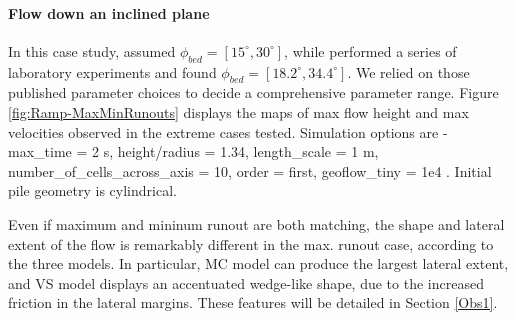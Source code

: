 \documentclass{article}
\begin{document}
\paragraph{Flow down an inclined plane}
In this case study, \cite{Dalbey2008} assumed $\phi_{bed}=[15^\mathrm{\circ}, 30^\mathrm{\circ}]$, while \cite{WebbBursik2016} performed a series of laboratory experiments and found $\phi_{bed}=[18.2^\mathrm{\circ}, 34.4^\mathrm{\circ}]$. We relied on those published parameter choices to decide a comprehensive parameter range. Figure \ref{fig:Ramp-MaxMinRunouts} displays the maps of max flow height and max velocities observed in the extreme cases tested. Simulation options are - max\_time = 2 s, height/radius = 1.34, length\_scale = 1 m, number\_of\_cells\_across\_axis = 10, order = first, geoflow\_tiny = 1e4 \citep{Patra2005,Aghakhani2016}. Initial pile geometry is cylindrical.


Even if maximum and mininum runout are both matching, the shape and lateral extent of the flow is remarkably different in the max. runout case, according to the three models. In particular, MC model can produce the largest lateral extent, and VS model displays an accentuated wedge-like shape, due to the increased friction in the lateral margins. These features will be detailed in Section \ref{Obs1}.
\end{document}
